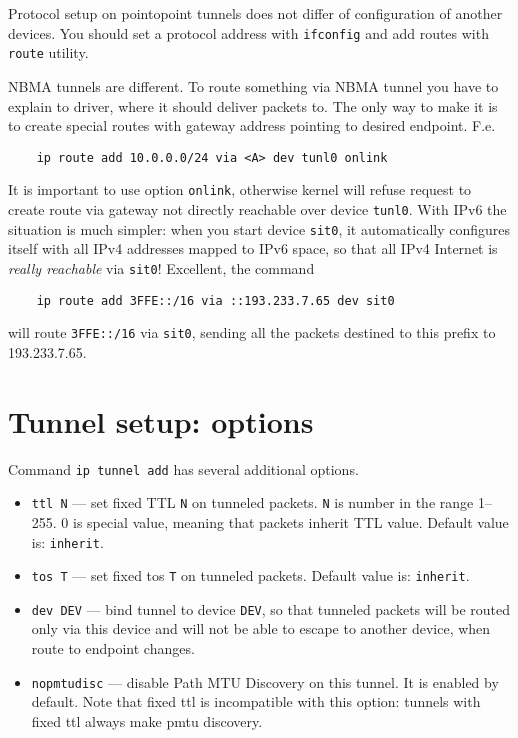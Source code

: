 Protocol setup on pointopoint tunnels does not differ of configuration
of another devices. You should set a protocol address with \verb|ifconfig|
and add routes with \verb|route| utility.

NBMA tunnels are different. To route something via NBMA tunnel
you have to explain to driver, where it should deliver packets to.
The only way to make it is to create special routes with gateway
address pointing to desired endpoint. F.e.\ 
\begin{verbatim}
    ip route add 10.0.0.0/24 via <A> dev tunl0 onlink
\end{verbatim}
It is important to use option \verb|onlink|, otherwise
kernel will refuse request to create route via gateway not directly
reachable over device \verb|tunl0|. With IPv6 the situation is much simpler:
when you start device \verb|sit0|, it automatically configures itself
with all IPv4 addresses mapped to IPv6 space, so that all IPv4
Internet is {\em really reachable} via \verb|sit0|! Excellent, the command
\begin{verbatim}
    ip route add 3FFE::/16 via ::193.233.7.65 dev sit0
\end{verbatim}
will route \verb|3FFE::/16| via \verb|sit0|, sending all the packets
destined to this prefix to 193.233.7.65.

\section{Tunnel setup: options}

Command \verb|ip tunnel add| has several additional options.
\begin{itemize}

\item \verb|ttl N| --- set fixed TTL \verb|N| on tunneled packets.
	\verb|N| is number in the range 1--255. 0 is special value,
	meaning that packets inherit TTL value. 
		Default value is: \verb|inherit|.

\item \verb|tos T| --- set fixed tos \verb|T| on tunneled packets.
		Default value is: \verb|inherit|.

\item \verb|dev DEV| --- bind tunnel to device \verb|DEV|, so that
	tunneled packets will be routed only via this device and will
	not be able to escape to another device, when route to endpoint changes.

\item \verb|nopmtudisc| --- disable Path MTU Discovery on this tunnel.
	It is enabled by default. Note that fixed ttl is incompatible
	with this option: tunnels with fixed ttl always make pmtu discovery.

\end{itemize}

